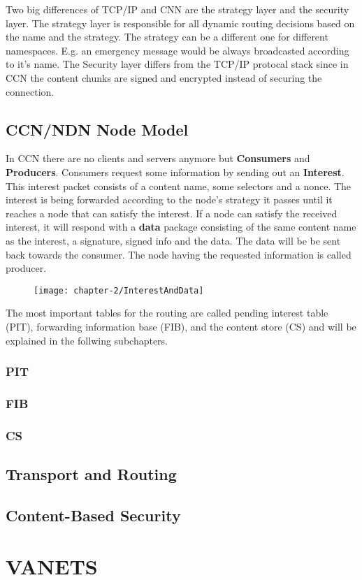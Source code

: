 Two big differences of TCP/IP and CNN are the strategy layer and the security layer. The strategy layer is responsible for all dynamic routing decisions based on the name and the strategy. The strategy can be a different one for different namespaces. E.g. an emergency message would be always broadcasted according to it's name. The Security layer differs from the TCP/IP protocal stack since in CCN the content chunks are signed and encrypted instead of securing the connection.

\subsection{CCN/NDN Node Model}

In CCN there are no clients and servers anymore but \textbf{Consumers} and \textbf{Producers}. Consumers request some information by sending out an \textbf{Interest}. This interest packet consists of a content name, some selectors and a nonce. The interest is being forwarded according to the node's strategy it passes until it reaches a node that can satisfy the interest. If a node can satisfy the received interest, it will respond with a \textbf{data} package consisting of the same content name as the interest, a signature, signed info and the data. The data will be be sent back towards the consumer. The node having the requested information is called producer.

\begin{figure}[h]
\texttt{[image: chapter-2/InterestAndData]}
\centering
\end{figure}

The most important tables for the routing are called pending interest table (PIT), forwarding information base (FIB), and the content store (CS) and will be explained in the follwing subchapters.

\subsubsection{PIT}

\subsubsection{FIB}

\subsubsection{CS} 


\subsection{Transport and Routing}

\subsection{Content-Based Security}



\section{VANETS}
